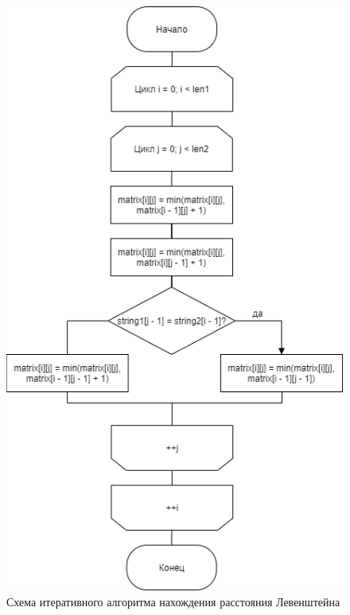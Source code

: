 \documentclass[12pt]{report}
\begin{document}
\begin{figure}[hp!]
	\centering
	\includegraphics[scale=0.75]{report_files/iteration_levenshtein.png}
	\caption{Схема итеративного алгоритма нахождения расстояния Левенштейна}
	\label{fig:mpr}
\end{figure}
\end{document}
